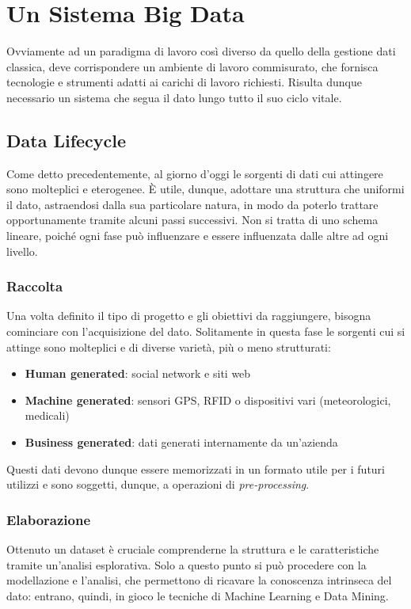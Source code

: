 \chapter{Un Sistema Big Data}
Ovviamente ad un paradigma di lavoro così diverso da quello della gestione dati classica, deve corrispondere un ambiente di lavoro commisurato, che fornisca tecnologie e strumenti adatti ai carichi di lavoro richiesti. Risulta dunque necessario un sistema che segua il dato lungo tutto il suo ciclo vitale.

\section{Data Lifecycle}
Come detto precedentemente, al giorno d'oggi le sorgenti di dati cui attingere sono molteplici e eterogenee. È utile, dunque, adottare una struttura che uniformi il dato, astraendosi dalla sua particolare natura, in modo da poterlo trattare opportunamente tramite alcuni passi successivi. Non si tratta di uno schema lineare, poiché ogni fase può influenzare e essere influenzata dalle altre ad ogni livello.

\subsection{Raccolta} 
Una volta definito il tipo di progetto e gli obiettivi da raggiungere, bisogna cominciare con l'acquisizione del dato. Solitamente in questa fase le sorgenti cui si attinge sono molteplici e di diverse varietà, più o meno strutturati:
\begin{itemize}
	\item \textbf{Human generated}: social network e siti web
    \item \textbf{Machine generated}: sensori GPS, RFID o dispositivi vari (meteorologici, medicali)
    \item \textbf{Business generated}: dati generati internamente da un'azienda
\end{itemize}
Questi dati devono dunque essere memorizzati in un formato utile per i futuri utilizzi e sono soggetti, dunque, a operazioni di \textit{pre-processing}.

\subsection{Elaborazione}
Ottenuto un dataset è cruciale comprenderne la struttura e le caratteristiche tramite un'analisi esplorativa. Solo a questo punto si può procedere con la modellazione e l'analisi, che permettono di ricavare la conoscenza intrinseca del dato: entrano, quindi, in gioco le tecniche di Machine Learning e Data Mining.
	
